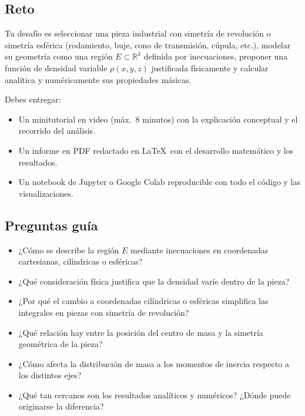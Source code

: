 \documentclass[a4,11pt]{aleph-notas}
\begin{document}
\subsection*{Reto}

Tu desafío es seleccionar una pieza industrial con simetría de revolución o simetría esférica (rodamiento, buje, cono de transmisión, cúpula, etc.), modelar su geometría como una región $E \subset \mathbb{R}^3$ definida por inecuaciones, proponer una función de densidad variable $\rho(x,y,z)$ justificada físicamente y calcular analítica y numéricamente sus propiedades másicas.

Debes entregar:
\begin{itemize}[leftmargin=*]
    \item Un minitutorial en video (máx.\ 8 minutos) con la explicación conceptual y el recorrido del análisis.
    \item Un informe en PDF redactado en \LaTeX\ con el desarrollo matemático y los resultados.
    \item Un notebook de Jupyter o Google Colab reproducible con todo el código y las visualizaciones.
\end{itemize}

\subsection*{Preguntas guía}
\begin{itemize}[leftmargin=*]
    \item ¿Cómo se describe la región $E$ mediante inecuaciones en coordenadas cartesianas, cilíndricas o esféricas?
    \item ¿Qué consideración física justifica que la densidad varíe dentro de la pieza?
    \item ¿Por qué el cambio a coordenadas cilíndricas o esféricas simplifica las integrales en piezas con simetría de revolución?
    \item ¿Qué relación hay entre la posición del centro de masa y la simetría geométrica de la pieza?
    \item ¿Cómo afecta la distribución de masa a los momentos de inercia respecto a los distintos ejes?
    \item ¿Qué tan cercanos son los resultados analíticos y numéricos? ¿Dónde puede originarse la diferencia?
\end{itemize}
\end{document}
